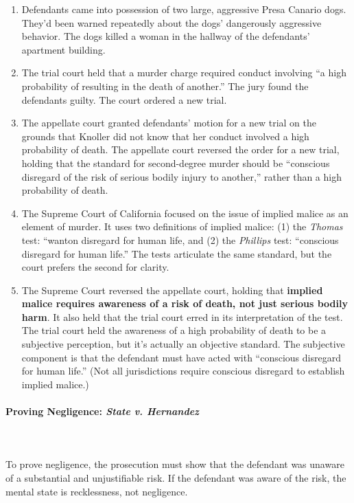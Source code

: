 \begin{enumerate}
    \item Defendants came into possession of two large, aggressive Presa 
    Canario dogs. They'd been warned repeatedly about the dogs' dangerously 
    aggressive behavior. The dogs killed a woman in the hallway of the 
    defendants' apartment building.
    \item The trial court held that a murder charge required conduct involving 
    ``a high probability of resulting in the death of another.'' The jury 
    found the defendants guilty. The court ordered a new trial.
    \item The appellate court granted defendants' motion for a new trial on 
    the grounds that Knoller did not know that her conduct involved a high 
    probability of death. The appellate court reversed the order for a new 
    trial, holding that the standard for second-degree murder should be 
    ``conscious disregard of the risk of serious bodily injury to another,'' 
    rather than a high probability of death.
    \item The Supreme Court of California focused on the issue of implied 
    malice as an element of murder. It uses two definitions of implied malice: 
    (1) the \emph{Thomas} test: ``wanton disregard for human life, and (2) the 
    \emph{Phillips} test: ``conscious disregard for human life.'' The tests 
    articulate the same standard, but the court prefers the second for 
    clarity.
    \item The Supreme Court reversed the appellate court, holding that 
    \textbf{implied malice requires awareness of a risk of death, not just 
    serious bodily harm}. It also held that the trial court erred in its 
    interpretation of the test. The trial court held the awareness of a high 
    probability of death to be a subjective perception, but it's actually an 
    objective standard. The subjective component is that the defendant must 
    have acted with ``conscious disregard for human life.'' (Not all 
    jurisdictions require conscious disregard to establish implied malice.)
\end{enumerate}

\paragraph{Proving Negligence: \emph{State v. Hernandez}}
~\\\\
To prove negligence, the prosecution must show that the defendant was unaware 
of a substantial and unjustifiable risk. If the defendant was aware of the 
risk, the mental state is recklessness, not negligence.

